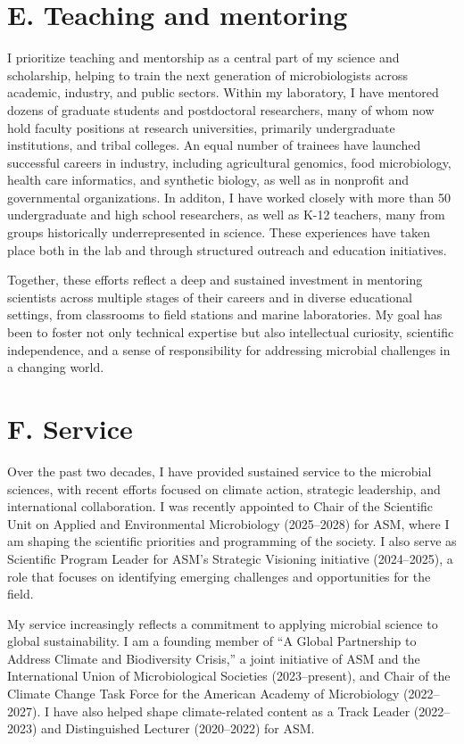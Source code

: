 \documentclass[11pt]{article}  %
\begin{document}
\section*{E. Teaching and mentoring}
\vspace{-0.5em}
I prioritize teaching and mentorship as a central part of my science and scholarship, helping to train the next generation of microbiologists across academic, industry, and public sectors. Within my laboratory, I have mentored dozens of graduate students and postdoctoral researchers, many of whom now hold faculty positions at research universities, primarily undergraduate institutions, and tribal colleges. An equal number of trainees have launched successful careers in industry, including agricultural genomics, food microbiology, health care informatics, and synthetic biology, as well as in nonprofit and governmental organizations. In additon, I have worked closely with more than 50 undergraduate and high school researchers, as well as K-12 teachers, many from groups historically underrepresented in science. These experiences have taken place both in the lab and through structured outreach and education initiatives.

Together, these efforts reflect a deep and sustained investment in mentoring scientists across multiple stages of their careers and in diverse educational settings, from classrooms to field stations and marine laboratories. My goal has been to foster not only technical expertise but also intellectual curiosity, scientific independence, and a sense of responsibility for addressing microbial challenges in a changing world.

\section*{F. Service}
\vspace{-0.5em}
Over the past two decades, I have provided sustained service to the microbial sciences, with recent efforts focused on climate action, strategic leadership, and international collaboration. I was recently appointed to Chair of the Scientific Unit on Applied and Environmental Microbiology (2025–2028) for ASM, where I am shaping the scientific priorities and programming of the society. I also serve as Scientific Program Leader for ASM’s Strategic Visioning initiative (2024–2025), a role that focuses on identifying emerging challenges and opportunities for the field.

My service increasingly reflects a commitment to applying microbial science to global sustainability. I am a founding member of “A Global Partnership to Address Climate and Biodiversity Crisis,” a joint initiative of ASM and the International Union of Microbiological Societies (2023–present), and Chair of the Climate Change Task Force for the American Academy of Microbiology (2022–2027). I have also helped shape climate-related content as a Track Leader (2022–2023) and Distinguished Lecturer (2020–2022) for ASM.
\end{document}
